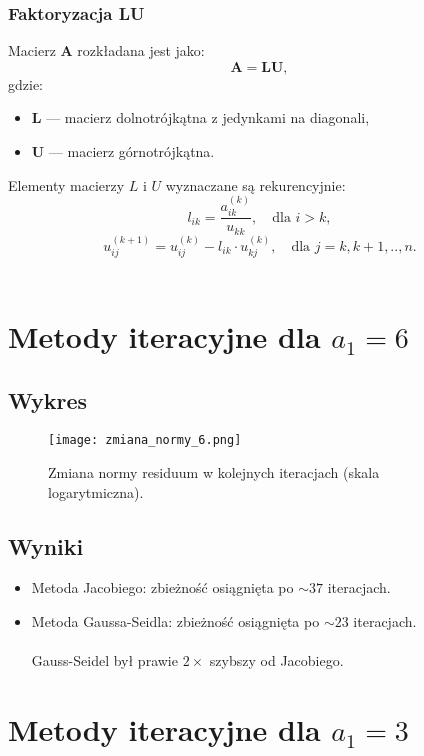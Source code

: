 \documentclass{article}
\begin{document}
\subsubsection*{Faktoryzacja LU}
Macierz $\mathbf{A}$ rozkładana jest jako:
\[
\mathbf{A} = \mathbf{L} \mathbf{U},
\]
gdzie:
\begin{itemize}
    \item $\mathbf{L}$ — macierz dolnotrójkątna z jedynkami na diagonali,
    \item $\mathbf{U}$ — macierz górnotrójkątna.
\end{itemize}

Elementy macierzy $L$ i $U$ wyznaczane są rekurencyjnie:
\begin{equation}
l_{ik} = \frac{a_{ik}^{(k)}}{u_{kk}}, \quad \text{dla } i > k,
\end{equation}
\begin{equation}
u_{ij}^{(k+1)} = u_{ij}^{(k)} - l_{ik} \cdot u_{kj}^{(k)}, \quad \text{dla } j = k, k+1,  .., n.
\end{equation}
\\

\section{Metody iteracyjne dla $a_1 = 6$}
\subsection{Wykres}
\begin{figure}[H]
    \centering
    \texttt{[image: zmiana\_normy\_6.png]}
    \caption{Zmiana normy residuum w kolejnych iteracjach (skala logarytmiczna).}
    \label{fig:zmiana_6}
\end{figure}

\subsection{Wyniki}
\begin{itemize}
    \item Metoda Jacobiego: zbieżność osiągnięta po $\sim 37$ iteracjach.
    \item Metoda Gaussa-Seidla: zbieżność osiągnięta po $\sim 23$ iteracjach.
\\\\ Gauss-Seidel był prawie $2\times$ szybszy od Jacobiego.
\end{itemize}

\section{Metody iteracyjne dla $a_1 = 3$}
\end{document}
